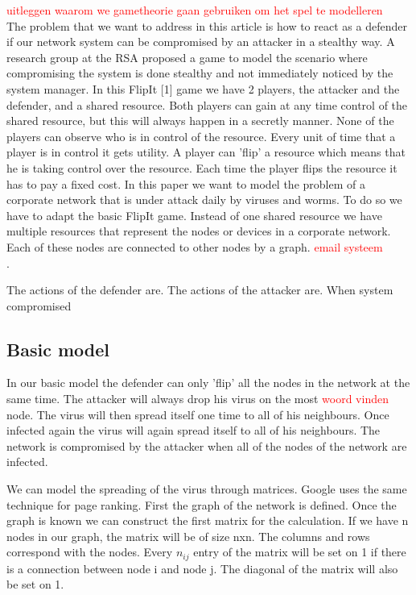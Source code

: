 \documentclass[a4paper, 11pt]{article}
\newcommand{\comment}[1]{\textcolor{red}{#1}\\}
\begin{document}
\comment{uitleggen waarom we gametheorie gaan gebruiken om het spel te modelleren}
 The problem that we want to address in this article is how to react as a defender if our network system can be compromised by an attacker in a stealthy way. A research group at the RSA proposed a game to model the scenario where compromising the system is done stealthy and not immediately noticed by the system manager. In this FlipIt [1] game we have 2 players, the attacker and the defender, and a shared resource.
 Both players can gain at any time control of the shared resource, but this will always happen in a secretly manner. None of the players can observe who is in control of the resource. Every unit of time that a player is in control it gets utility. A player can 'flip' a resource which means that he is taking control over the resource. Each time the player flips the resource it has to pay a fixed cost.
 In this paper we want to model the problem of a corporate network that is under attack daily by viruses and worms. To do so we have to adapt the basic FlipIt game. Instead of one shared resource we have multiple resources that represent the nodes or devices in a corporate network. Each of these nodes are connected to other nodes by a graph.  \comment{email systeem }.
 
 The actions of the defender are. The actions of the attacker are. When system compromised
 
 \subsection{Basic model}
 In our basic model the defender can only 'flip' all the nodes in the network at the same time. The attacker will always drop his virus on the most \comment{woord vinden} node. The virus will then spread itself one time to all of his neighbours. Once infected again the virus will again spread itself to all of his neighbours. The network is compromised by the attacker when all of the nodes of the network are infected. 
 
 We can model the spreading of the virus through matrices. Google uses the same technique for page ranking. First the graph of the network is defined. Once the graph is known we can construct the first matrix for the calculation. If we have n nodes in our graph, the matrix will be of size nxn. The columns and rows correspond with the nodes. Every $n_{ij}$ entry of the matrix will be set on 1 if there is a connection between node i and node j. The diagonal of the matrix will also be set on 1.
 
\end{document}
